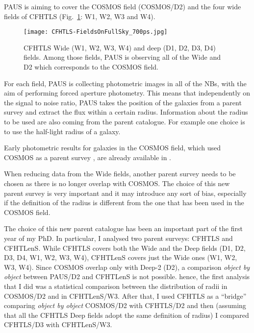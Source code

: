 \documentclass[11pt]{article}
\begin{document}
PAUS is aiming to cover the COSMOS field (COSMOS/D2) and the four wide fields of CFHTLS (Fig.~\ref{fig:CFHTLS_fields}: W1, W2, W3 and W4).
%
\begin{figure}
\centering
\texttt{[image: CFHTLS-FieldsOnFullSky\_700ps.jpg]}
\caption{CFHTLS Wide (W1, W2, W3, W4) and deep (D1, D2, D3, D4) fields. Among those fields, PAUS is observing all of the Wide and D2 which corresponds to the COSMOS field. }
\label{fig:CFHTLS_fields}
\end{figure}
%
For each field, PAUS is collecting photometric images in all of the NBs, with the aim of performing forced aperture photometry. This means that independently on the signal to noise ratio, PAUS takes the position of the galaxies from a parent survey and extract the flux within a certain radius. Information about the radius to be used are also coming from the parent catalogue. For example one choice is to use the half-light radius of a galaxy.

Early photometric results for galaxies in the COSMOS field, which used COSMOS as a parent survey \citep{scarlata07}, are already available in \cite{eriksen18}. 

When reducing data from the Wide fields, another parent survey needs to be chosen as there is no longer overlap with COSMOS. The choice of this new parent survey is very important and it may introduce any sort of bias, especially if the definition of the radius is different from the one that has been used in the COSMOS field. 

The choice of this new parent catalogue has been an important part of the first year of my PhD. In particular, I analysed two parent surveys: CFHTLS and CFHTLenS. While CFHTLS covers both the Wide and the Deep fields (D1, D2, D3, D4, W1, W2, W3, W4), CFHTLenS covers just the Wide ones (W1, W2, W3, W4). Since COSMOS overlap only with Deep-2 (D2), a comparison \textit{object by object} between PAUS/D2 and CFHTLenS is not possible. hence, the first analysis that I did was a statistical comparison between the distribution of radii in COSMOS/D2 and in CFHTLenS/W3. After that, I used CFHTLS as a ``bridge'' comparing \textit{object by object} COSMOS/D2 with CFHTLS/D2 and then (assuming that all the CFHTLS Deep fields adopt the same definition of radius) I compared CFHTLS/D3 with CFHTLenS/W3. 
\end{document}
